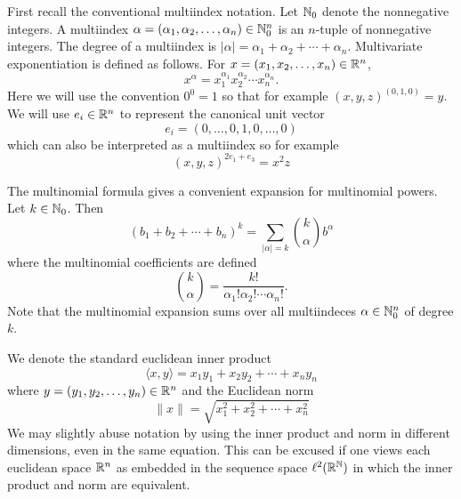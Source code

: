 \begin{notationpage}

\vskip 15mm

First recall the conventional multiindex notation. Let $\mathbb{N}_0$ denote the nonnegative integers. A multiindex $\alpha = (\alpha_1, \alpha_2, \ldots, \alpha_n) \in \mathbb{N}_0^n$ is an $n$-tuple of nonnegative integers. The degree of a multiindex is $|\alpha| = \alpha_1 + \alpha_2 + \cdots + \alpha_n$. Multivariate exponentiation is defined as follows. For $x = (x_1, x_2, \ldots, x_n) \in \mathbb{R}^n$,
\[
  x^\alpha = x_1^{\alpha_1}x_2^{\alpha_2} \cdots x_n^{\alpha_n}.
\]
Here we will use the convention $0^0 = 1$ so that for example $(x, y, z)^{(0, 1, 0)} = y$. We will use $e_i \in \mathbb{R}^n$ to represent the canonical unit vector
\[
  e_i = (0, \ldots, 0, 1, 0, \ldots, 0)
\]
which can also be interpreted as a multiindex so for example
\[
  (x,y,z)^{2e_1 + e_3} = x^2z
\]

The multinomial formula gives a convenient expansion for multinomial powers. Let $k \in \mathbb{N}_0$. Then
\[
  {(b_1 + b_2 + \cdots + b_n)}^k = \sum_{|\alpha| = k} \binom{k}{\alpha} b^\alpha
\] 
where the multinomial coefficients are defined
\[
  \binom{k}{\alpha} = \frac{k!}{\alpha_1! \alpha_2! \cdots \alpha_n!}.
\]
Note that the multinomial expansion sums over all multiindeces $\alpha \in \mathbb{N}_0^n$ of degree $k$.

We denote the standard euclidean inner product
\[
  \langle x,y \rangle = x_1y_1 + x_2y_2 + \cdots + x_n y_n
\]
where $y = (y_1, y_2, \ldots, y_n) \in \mathbb{R}^n$ and the Euclidean norm 
\[
  \|x\| = \sqrt{x_1^2 + x_2^2 + \cdots + x_n^2}
\]
We may slightly abuse notation by using the inner product and norm in different dimensions, even in the same equation. This can be excused if one views each euclidean space $\mathbb{R}^n$ as embedded in the sequence space $\ell^2(\mathbb{R}^{\mathbb{N}})$ in which the inner product and norm are equivalent.


\end{notationpage}
